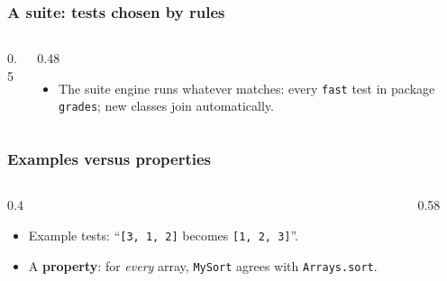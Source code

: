 \documentclass[aspectratio=169,10pt,compress]{beamer}
\begin{document}
\begin{frame}[t,fragile] \frametitle{A suite: tests chosen by rules}
  \begin{columns}[T]
    \begin{column}{0.5\textwidth}
    \end{column}
    \begin{column}{0.48\textwidth}
      \begin{itemize}\small
        \item The suite engine runs whatever matches: every \texttt{fast} test in package \texttt{grades}; new classes join automatically.
      \end{itemize}
    \end{column}
  \end{columns}
\end{frame}





\begin{frame}[t,fragile] \frametitle{Examples versus properties}
  \begin{columns}[T]
    \begin{column}{0.4\textwidth}
      \begin{itemize}\small
        \item Example tests: ``\texttt{[3, 1, 2]} becomes \texttt{[1, 2, 3]}''.
        \item A \textbf{property}: for \emph{every} array, \texttt{MySort} agrees with \texttt{Arrays.sort}.
      \end{itemize}
    \end{column}
    \begin{column}{0.58\textwidth}
    \end{column}
  \end{columns}
\end{frame}
\end{document}
